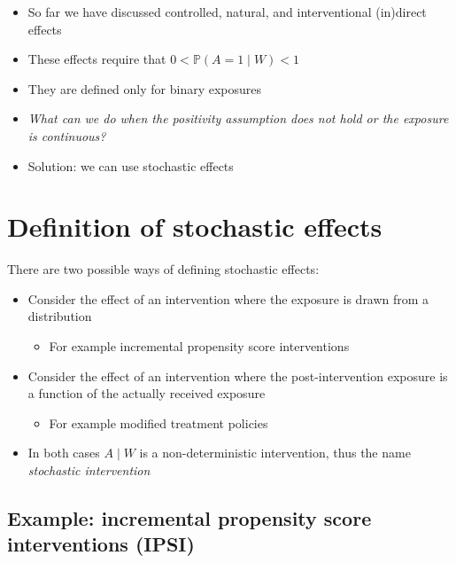 \documentclass[
  12pt,
]{book}
\providecommand{\tightlist}{%
  \setlength{\itemsep}{0pt}\setlength{\parskip}{0pt}}
\theoremstyle{definition}
\theoremstyle{definition}
\theoremstyle{definition}
\renewcommand{\P}{\mathbb{P}}
\newcommand{\1}{\mathbbm{1}}
\begin{document}
\begin{itemize}
\tightlist
\item
  So far we have discussed controlled, natural, and interventional (in)direct effects
\item
  These effects require that \(0 < \P(A=1\mid W) < 1\)
\item
  They are defined only for binary exposures
\item
  \emph{What can we do when the positivity assumption does not hold or the exposure
  is continuous?}
\item
  Solution: we can use stochastic effects
\end{itemize}

\hypertarget{definition-of-stochastic-effects}{%
\section{Definition of stochastic effects}\label{definition-of-stochastic-effects}}

There are two possible ways of defining stochastic effects:

\begin{itemize}
\tightlist
\item
  Consider the effect of an intervention where the exposure is drawn from a
  distribution

  \begin{itemize}
  \tightlist
  \item
    For example incremental propensity score interventions
  \end{itemize}
\end{itemize}

\begin{itemize}
\tightlist
\item
  Consider the effect of an intervention where the post-intervention exposure is
  a function of the actually received exposure

  \begin{itemize}
  \tightlist
  \item
    For example modified treatment policies
  \end{itemize}
\item
  In both cases \(A \mid W\) is a non-deterministic intervention, thus the name
  \emph{stochastic intervention}
\end{itemize}

\hypertarget{ipsi}{%
\subsection{\texorpdfstring{Example: incremental propensity score interventions (IPSI) \citep{kennedy2018nonparametric}}{Example: incremental propensity score interventions (IPSI) {[}@kennedy2018nonparametric{]}}}\label{ipsi}}
\end{document}
